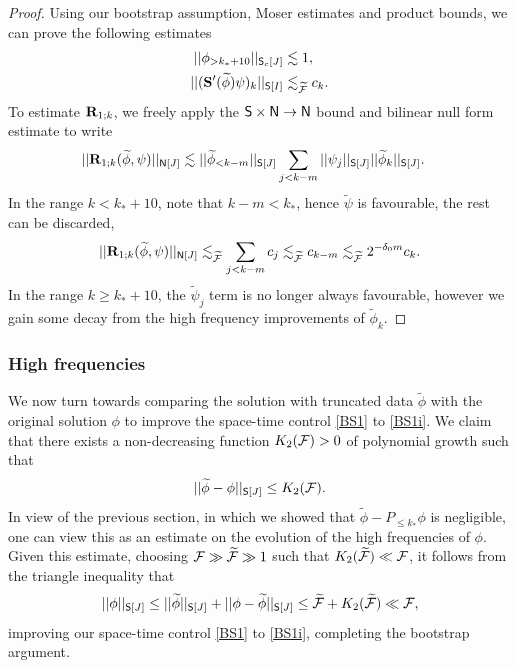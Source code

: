 \begin{proof}
Using our bootstrap assumption, Moser estimates and product bounds, we can prove the following estimates 
	\begin{align}
		|| \phi_{>k_* + 10}||_{\mathsf S_c[J]} 
			&\lesssim 1, \\
		||({\bf S}' (\widetilde\phi)\psi)_k||_{\mathsf S [I]}
			&\lesssim_{\widetilde {\mathcal F}} c_k.
	\end{align}
	To estimate ${\bf R}_{1;k}$, we freely apply the $\mathsf S \times \mathsf N \to \mathsf N$ bound and bilinear null form estimate to write
		\begin{align*}
			||{\bf R}_{1;k} (\widetilde\phi, \psi)||_{\mathsf N[J]}
				&\lesssim ||\widetilde \phi_{< k - m}||_{\mathsf S[J]} \sum_{j < k - m} ||\psi_j ||_{\mathsf S[J]} ||\widetilde \phi_k||_{\mathsf S[J]}.
		\end{align*}	
	In the range $k < k_* + 10$, note that $k - m < k_*$, hence $\widetilde \psi$ is favourable, the rest can be discarded,
		\begin{align*}
			||{\bf R}_{1;k} (\widetilde\phi, \psi)||_{\mathsf N[J]} \lesssim_{\widetilde {\mathcal F}} \sum_{j < k - m} c_j \lesssim_{\widetilde {\mathcal F}} c_{k - m} \lesssim_{\widetilde {\mathcal F}} 2^{-\delta_0 m} c_k. 
		\end{align*}
	In the range $k \geq k_* + 10$, the $\widetilde \psi_j$ term is no longer always favourable, however we gain some decay from the high frequency improvements of $\widetilde\phi_k$. 
\end{proof}




\subsubsection{High frequencies}

We now turn towards comparing the solution with truncated data $\widetilde \phi$ with the original solution $\phi$ to improve the space-time control \eqref{BS1} to \eqref{BS1i}. We claim that there exists a non-decreasing function $K_2 (\mathcal F) > 0$ of polynomial growth such that 
	\[
		||\widetilde \phi - \phi||_{\mathsf S[J]} \leq K_2 (\mathcal F). 
	\]
In view of the previous section, in which we showed that $\widetilde \phi - P_{\leq k_*} \phi$ is negligible, one can view this as an estimate on the evolution of the high frequencies of $\phi$. Given this estimate, choosing $\mathcal F \gg \widetilde {\mathcal F} \gg 1$ such that $K_2 (\widetilde {\mathcal F}) \ll \mathcal F$, it follows from the triangle inequality that
	\[
		||\phi ||_{\mathsf S[J]} 
			\leq ||\widetilde \phi||_{\mathsf S[J]} + ||\phi - \widetilde \phi||_{\mathsf S[J]} \leq \widetilde {\mathcal F} + K_2 (\widetilde {\mathcal F}) \ll \mathcal F,
	\]
improving our space-time control \eqref{BS1} to \eqref{BS1i}, completing the bootstrap argument. 


